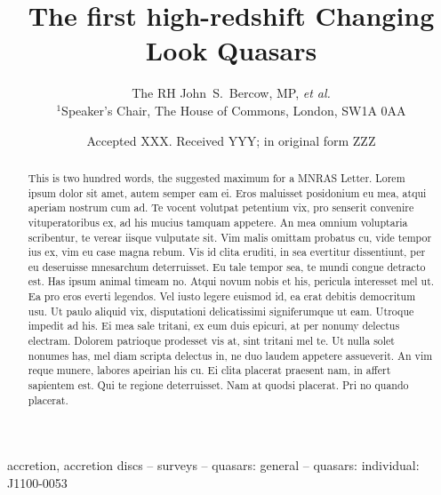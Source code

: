 \documentclass[a4paper,fleqn,usenatbib]{mnras}
\title[High-redshift CLQs]{The first high-redshift Changing Look Quasars}
\author[Bercow]
{The RH John~S.~Bercow, MP, {\it et al.} 
\\
$^{1}$Speaker's Chair, The House of Commons, London, SW1A 0AA \\
}
\date{Accepted XXX. Received YYY; in original form ZZZ}
\begin{document}
\label{firstpage}
\pagerange{\pageref{firstpage}--\pageref{lastpage}}
\maketitle


\begin{abstract}
This is two hundred words, the suggested maximum for a MNRAS
Letter. Lorem ipsum dolor sit amet, autem semper eam ei. Eros
maluisset posidonium eu mea, atqui aperiam nostrum cum ad. Te vocent
volutpat petentium vix, pro senserit convenire vituperatoribus ex, ad
his mucius tamquam appetere. An mea omnium voluptaria scribentur, te
verear iisque vulputate sit. Vim malis omittam probatus cu, vide
tempor ius ex, vim eu case magna rebum. Vis id clita eruditi, in sea
evertitur dissentiunt, per eu deseruisse mnesarchum deterruisset. Eu
tale tempor sea, te mundi congue detracto est. Has ipsum animal timeam
no. Atqui novum nobis et his, pericula interesset mel ut. Ea pro eros
everti legendos. Vel iusto legere euismod id, ea erat debitis
democritum usu. Ut paulo aliquid vix, disputationi delicatissimi
signiferumque ut eam. Utroque impedit ad his. Ei mea sale tritani, ex
eum duis epicuri, at per nonumy delectus electram. Dolorem patrioque
prodesset vis at, sint tritani mel te. Ut nulla solet nonumes has, mel
diam scripta delectus in, ne duo laudem appetere assueverit. An vim
reque munere, labores apeirian his cu. Ei clita placerat praesent nam,
in affert sapientem est. Qui te regione deterruisset. Nam at quodsi
placerat. Pri no quando placerat.
\end{abstract}

\begin{keywords}
accretion, accretion discs -- surveys -- quasars: general -- quasars: individual: J1100-0053 
\end{keywords}



\end{document}
